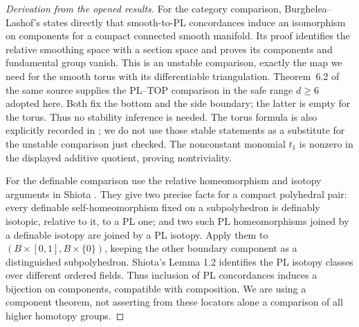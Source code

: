 \begin{proof}[Derivation from the opened results]
For the category comparison, Burghelea--Lashof's
\cite[Theorem~6.1, p.~41; proof pp.~42--43]{BurgheleaLashof1974II}
states directly that smooth-to-PL concordances induce an
isomorphism on components for a compact connected smooth
manifold. Its proof identifies the relative smoothing space
with a section space and proves its components and fundamental
group vanish. This is an unstable comparison, exactly the map
we need for the smooth torus with its differentiable
triangulation. Theorem~6.2 of the same source supplies the
PL--TOP comparison in the safe range $d\geq6$ adopted here.
Both fix the bottom and the side boundary; the latter is empty
for the torus. Thus no stability inference is needed.
The torus formula is also explicitly recorded in
\cite[\S6.2, p.~34, equation~(6.12), Lemmas~6.16--6.17]{CourtePorcelli2025};
we do not use those stable statements as a substitute for the
unstable comparison just checked.
The nonconstant monomial $t_1$ is nonzero in the displayed
additive quotient, proving nontriviality.

For the definable comparison use the relative homeomorphism and isotopy
arguments in Shiota \cite[Theorem 2.1 and its complement; Lemma 3.3,
proof of injectivity, pp.~44--46]{Shiota2010}. They give two precise
facts for a compact polyhedral pair: every definable self-homeomorphism
fixed on a subpolyhedron is definably isotopic, relative to it, to a PL
one; and two such PL homeomorphisms joined by a definable isotopy are
joined by a PL isotopy. Apply them to
$(B\times[0,1],B\times\{0\})$, keeping the other boundary component
as a distinguished subpolyhedron. Shiota's Lemma 1.2 identifies the
PL isotopy classes over different ordered fields. Thus inclusion of PL
concordances induces a bijection on components, compatible with
composition. We are using a component theorem, not asserting from
these locators alone a comparison of all higher homotopy groups.
\end{proof}

